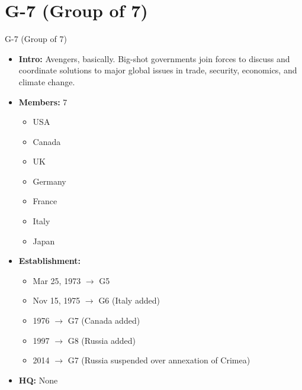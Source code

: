 \documentclass[
  12pt,
  ignorenonframetext,
  progressbar=frametitle]{beamer}
\providecommand{\tightlist}{%
  \setlength{\itemsep}{0pt}\setlength{\parskip}{0pt}}
\begin{document}
\section{G-7 (Group of 7)}
\begin{frame}[allowframebreaks]
{G-7 (Group of 7)}
\protect\hypertarget{g-7-group-of-7}{}
\begin{itemize}
\tightlist
\item
  \textbf{Intro:} Avengers, basically. Big-shot governments join forces
  to discuss and coordinate solutions to major global issues in trade,
  security, economics, and climate change.
\item
  \textbf{Members:} 7

  \begin{itemize}
  \tightlist
  \item
    USA
  \item
    Canada
  \item
    UK
  \item
    Germany
  \item
    France
  \item
    Italy
  \item
    Japan
  \end{itemize}
\item
  \textbf{Establishment:}

  \begin{itemize}
  \tightlist
  \item
    Mar 25, 1973 \(\rightarrow\) G5
  \item
    Nov 15, 1975 \(\rightarrow\) G6 (Italy added)
  \item
    1976 \(\rightarrow\) G7 (Canada added)
  \item
    1997 \(\rightarrow\) G8 (Russia added)
  \item
    2014 \(\rightarrow\) G7 (Russia suspended over annexation of Crimea)
  \end{itemize}
\item
  \textbf{HQ:} None
\end{itemize}
\end{frame}
\end{document}
